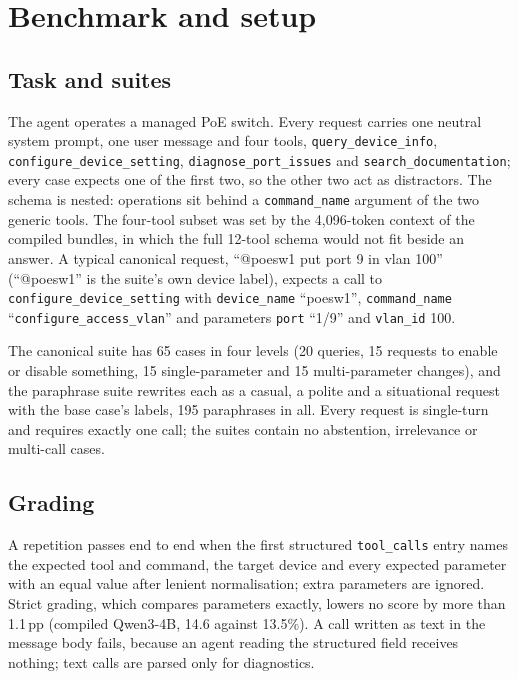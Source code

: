 \documentclass[11pt]{article}
\newcommand{\tool}[1]{\texttt{#1}}
\begin{document}
\section{Benchmark and setup}\label{sec:setup}

\subsection{Task and suites}\label{sec:task}

The agent operates a managed PoE switch. Every request carries one neutral system prompt, one user message and four tools, \tool{query\_device\_info}, \tool{configure\_device\_setting}, \tool{diagnose\_port\_issues} and \tool{search\_documentation}; every case expects one of the first two, so the other two act as distractors. The schema is nested: operations sit behind a \texttt{command\_name} argument of the two generic tools. The four-tool subset was set by the 4,096-token context of the compiled bundles, in which the full 12-tool schema would not fit beside an answer. A typical canonical request, ``@poesw1 put port 9 in vlan 100'' (``@poesw1'' is the suite's own device label), expects a call to \tool{configure\_device\_setting} with \texttt{device\_name} ``poesw1'', \texttt{command\_name} ``\texttt{configure\_access\_vlan}'' and parameters \texttt{port} ``1/9'' and \texttt{vlan\_id} 100.

The canonical suite has 65 cases in four levels (20 queries, 15 requests to enable or disable something, 15 single-parameter and 15 multi-parameter changes), and the paraphrase suite rewrites each as a casual, a polite and a situational request with the base case's labels, 195 paraphrases in all. Every request is single-turn and requires exactly one call; the suites contain no abstention, irrelevance or multi-call cases.

\subsection{Grading}\label{sec:grading}

A repetition passes end to end when the first structured \texttt{tool\_calls} entry names the expected tool and command, the target device and every expected parameter with an equal value after lenient normalisation; extra parameters are ignored. Strict grading, which compares parameters exactly, lowers no score by more than 1.1\,pp (compiled Qwen3-4B, 14.6 against 13.5\%). A call written as text in the message body fails, because an agent reading the structured field receives nothing; text calls are parsed only for diagnostics.
\end{document}
